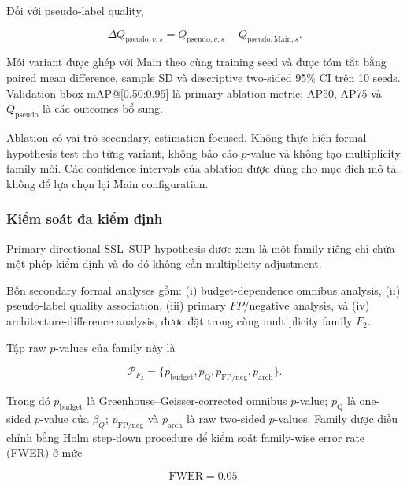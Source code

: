 \documentclass[pdflatex,sn-mathphys-num]{sn-jnl}%
\theoremstyle{thmstyleone}%
\theoremstyle{thmstyletwo}%
\theoremstyle{thmstylethree}%
\begin{document}
Đối với pseudo-label quality,

\begin{equation}
\Delta Q_{\mathrm{pseudo},v,s}
=
Q_{\mathrm{pseudo},v,s}
-
Q_{\mathrm{pseudo,Main},s}.
\label{eq:ablation_qpseudo_effect}
\end{equation}

Mỗi variant được ghép với Main theo cùng training seed và được tóm tắt bằng
paired mean difference, sample SD và descriptive two-sided 95\% CI trên 10
seeds. Validation bbox mAP@[0.50:0.95] là primary ablation metric; AP50,
AP75 và \(Q_{\mathrm{pseudo}}\) là các outcomes bổ sung.

Ablation có vai trò secondary, estimation-focused. Không thực hiện formal
hypothesis test cho từng variant, không báo cáo \(p\)-value và không tạo
multiplicity family mới. Các confidence intervals của ablation được dùng
cho mục đích mô tả, không để lựa chọn lại Main configuration.

\subsubsection{Kiểm soát đa kiểm định}
\label{subsubsec:multiplicity_control}

Primary directional SSL--SUP hypothesis được xem là một family riêng chỉ
chứa một phép kiểm định và do đó không cần multiplicity adjustment.

Bốn secondary formal analyses gồm:
(i) budget-dependence omnibus analysis,
(ii) pseudo-label quality association,
(iii) primary \(FP/\mathrm{negative}\) analysis, và
(iv) architecture-difference analysis,
được đặt trong cùng multiplicity family \(F_2\).

Tập raw \(p\)-values của family này là

\begin{equation}
\mathcal{P}_{F_2}
=
\{
p_{\mathrm{budget}},
p_{\mathrm{Q}},
p_{\mathrm{FP/neg}},
p_{\mathrm{arch}}
\}.
\label{eq:holm_f2_family}
\end{equation}

Trong đó \(p_{\mathrm{budget}}\) là Greenhouse--Geisser-corrected omnibus
\(p\)-value; \(p_{\mathrm{Q}}\) là one-sided \(p\)-value của
\(\beta_Q\); \(p_{\mathrm{FP/neg}}\) và \(p_{\mathrm{arch}}\) là raw
two-sided \(p\)-values. Family được điều chỉnh bằng Holm step-down procedure để kiểm soát
family-wise error rate (FWER) ở mức

\begin{equation}
\mathrm{FWER}=0.05.
\label{eq:holm_f2_fwer}
\end{equation}
\end{document}
